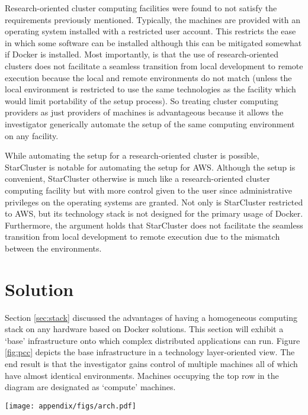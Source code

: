 Research-oriented cluster computing facilities were found to not satisfy the requirements previously mentioned.
%
Typically, the machines are provided with an operating system installed with a restricted user account.
%
This restricts the ease in which some software can be installed although this can be mitigated somewhat if \textsf{Docker} is installed.
%
Most importantly, is that the use of research-oriented clusters does not facilitate a seamless transition from local development to remote execution because the local and remote environments do not match (unless the local environment is restricted to use the same technologies as the facility which would limit portability of the setup process).
%
So treating cluster computing providers as just providers of machines is advantageous because it allows the investigator generically automate the setup of the same computing environment on any facility.


While automating the setup for a research-oriented cluster is possible, \textsf{StarCluster} is notable for automating the setup for \textsf{AWS}.
%
Although the setup is convenient, \textsf{StarCluster} otherwise is much like a research-oriented cluster computing facility but with more control given to the user since administrative privileges on the operating systems are granted.
%
Not only is \textsf{StarCluster} restricted to \textsf{AWS}, but its technology stack is not designed for the primary usage of \textsf{Docker}.
%
Furthermore, the argument holds that \textsf{StarCluster} does not facilitate the seamless transition from local development to remote execution due to the mismatch between the environments.



\section{Solution}


Section \ref{sec:stack} discussed the advantages of having a homogeneous computing stack on any hardware based on \textsf{Docker} solutions.
%
This section will exhibit a `base' infrastructure onto which complex distributed applications can run.
%
Figure \ref{fig:pcc} depicts the base infrastructure in a technology layer-oriented view.
%
The end result is that the investigator gains control of multiple machines all of which have almost identical environments.
%
Machines occupying the top row in the diagram are designated as `compute' machines.

\begin{sidewaysfigure}[h]

  \texttt{[image: appendix/figs/arch.pdf]}

\caption[Generic infrastructure for distributed computation based on \textsf{Docker}]{
Generic infrastructure for distributed computation based on \textsf{Docker}.
%
Dashed boxes group networks.
%
The (dotted) \textsf{Weave} network crosses network boundaries.
}
\label{fig:pcc}
\end{sidewaysfigure}


